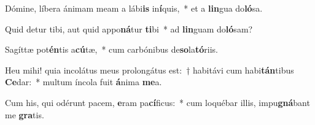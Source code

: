 \item Dómine, líbera ánimam meam a lábi\textbf{is} in\textbf{í}quis,~* et a \textbf{lin}gua do\textbf{ló}sa.
\item Quid detur tibi, aut quid appo\textbf{ná}tur \textbf{ti}bi~* ad \textbf{lin}guam do\textbf{ló}sam?
\item Sagíttæ pot\textbf{én}tis a\textbf{cú}tæ,~* cum carbónibus de\textbf{so}la\textbf{tó}riis.
\item Heu mihi! quia incolátus meus prolongátus est:~† habitávi cum habi\textbf{tán}tibus \textbf{Ce}dar:~* multum íncola fuit \textbf{á}nima \textbf{me}a.
\item Cum his, qui odérunt pacem, \textbf{e}ram pa\textbf{cí}ficus:~* cum loquébar illis, impu\textbf{gná}bant me \textbf{gra}tis.
